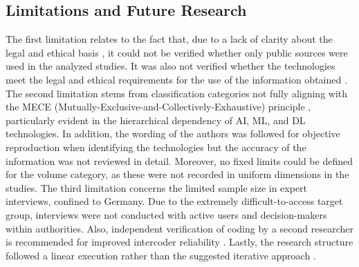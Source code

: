 \documentclass[10pt]{article}
\begin{document}

\subsection{Limitations and Future Research}

The first limitation relates to the fact that, due to a lack of clarity about the legal
and ethical basis \cite{Ghioni.2023,Wittmer.2022},
it could not be verified whether only public sources \cite{NorthAtlanticTreatyOrganization.2002} were used
in the analyzed studies. It was also not verified whether the technologies meet the
legal and ethical requirements for the use of the information obtained
\cite{PastorGalindo.2020,Wittmer.2022}. The second
limitation stems from classification categories not fully aligning with the
MECE (Mutually-Exclusive-and-Collectively-Exhaustive) principle \cite{Lee.2018},
particularly evident in the hierarchical dependency of AI, ML, and DL technologies. In addition,
the wording of the authors was followed for objective reproduction when identifying the technologies
but the accuracy of the information was not reviewed in detail. Moreover, no fixed limits could be defined
for the volume category, as these were not recorded in uniform dimensions in the studies.
The third limitation concerns the limited sample size in expert interviews, confined to Germany. Due to the
extremely difficult-to-access target group, interviews were not conducted with active users and decision-makers within authorities.
Also, independent verification of coding by a second researcher is recommended for improved intercoder reliability
\cite{Bogner.2002c, Glaser.2009}. Lastly, the research structure followed a linear execution rather than the suggested iterative approach \cite{Peffers.2007}.
\end{document}
